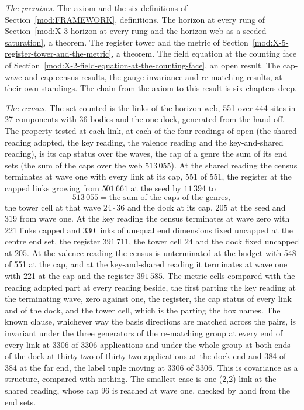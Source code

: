 \begin{chproof}
\textit{The premises.} The axiom and the six definitions of Section~\ref{mod:FRAMEWORK}, definitions. The horizon at every rung of Section~\ref{mod:X-3-horizon-at-every-rung-and-the-horizon-web-as-a-seeded-saturation}, a theorem. The register tower and the metric of Section~\ref{mod:X-5-register-tower-and-the-metric}, a theorem. The field equation at the counting face of Section~\ref{mod:X-2-field-equation-at-the-counting-face}, an open result. The cap-wave and cap-census results, the gauge-invariance and re-matching results, at their own standings. The chain from the axiom to this result is six chapters deep.

\textit{The census.} The set counted is the links of the horizon web, 551 over 444 sites in 27 components with 36 bodies and the one dock, generated from the hand-off. The property tested at each link, at each of the four readings of open (the shared reading adopted, the key reading, the valence reading and the key-and-shared reading), is its cap status over the waves, the cap of a genre the sum of its end sets (the sum of the caps over the web $513\,055$). At the shared reading the census terminates at wave one with every link at its cap, 551 of 551, the register at the capped links growing from $501\,661$ at the seed by $11\,394$ to
\begin{equation}
513\,055=\text{the sum of the caps of the genres},
\end{equation}
the tower cell at that wave $24\cdot 36$ and the dock at its cap, $205$ at the seed and $319$ from wave one. At the key reading the census terminates at wave zero with 221 links capped and 330 links of unequal end dimensions fixed uncapped at the centre end set, the register $391\,711$, the tower cell $24$ and the dock fixed uncapped at $205$. At the valence reading the census is unterminated at the budget with 548 of 551 at the cap, and at the key-and-shared reading it terminates at wave one with 221 at the cap and the register $391\,585$. The metric cells compared with the reading adopted part at every reading beside, the first parting the key reading at the terminating wave, zero against one, the register, the cap status of every link and of the dock, and the tower cell, which is the parting the box names. The known clause, whichever way the basis directions are matched across the pairs, is invariant under the three generators of the re-matching group at every end of every link at 3306 of 3306 applications and under the whole group at both ends of the dock at thirty-two of thirty-two applications at the dock end and 384 of 384 at the far end, the label tuple moving at 3306 of 3306. This is covariance as a structure, compared with nothing. The smallest case is one (2,2) link at the shared reading, whose cap $96$ is reached at wave one, checked by hand from the end sets.


\end{chproof}
